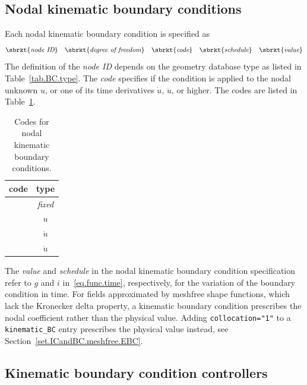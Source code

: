 \subsection{Nodal kinematic boundary conditions}
\label{set.ICandBC.KBC}
Each nodal kinematic boundary condition is specified as
\[
\sbrkt{\textit{node ID}} \quad 
\sbrkt{\textit{degree of freedom}} \quad
\sbrkt{\textit{code}} \quad
\sbrkt{\textit{schedule}} \quad
\sbrkt{\textit{value}} 
\]
The definition of the \textit{node ID} depends on the geometry 
database type as listed in Table~\ref{tab.BC.type}. The \textit{code} 
specifies if the condition is applied to the nodal unknown $u$, or one 
of its time derivatives $\dot{u}$, $\ddot{u}$, or higher. The codes 
are listed in Table~\ref{tab.KBC.code}.
\begin{table}[h]
\begin{center}
\caption{\label{tab.KBC.code} Codes for nodal kinematic boundary 
conditions.}
\begin{tabular}[c]{|c|c|}
\hline
 \parbox[b]{0.75in}{\centering \textbf{code}}
&\parbox[b]{0.75in}{\centering \textbf{type}}\\
\hline
 \parbox[b]{0.75in}{}
&\parbox[b]{0.75in}{\centering \textit{fixed}}\\
\hline
 \parbox[b]{0.75in}{}
&\parbox[b]{0.75in}{\centering $u$}\\
\hline
 \parbox[b]{0.75in}{}
&\parbox[b]{0.75in}{\centering $\dot{u}$}\\
\hline
 \parbox[b]{0.75in}{}
&\parbox[b]{0.75in}{\centering $\ddot{u}$}\\
\hline
\end{tabular}
\end{center}
\end{table}
The \textit{value} and \textit{schedule} in the nodal kinematic 
boundary condition specification refer to 
$g$ and $i$ in~\eqref{eq.func.time}, respectively, for the variation 
of the boundary condition in time.
For fields approximated by meshfree shape functions, which lack the Kronecker delta property,
a kinematic boundary condition prescribes the nodal coefficient rather than the physical value.
Adding \texttt{collocation="1"} to a \texttt{kinematic\_BC} entry prescribes the physical value
instead, see Section~\ref{set.ICandBC.meshfree.EBC}.

\subsection{Kinematic boundary condition controllers}
\label{set.ICandBC.KBC.controller}

